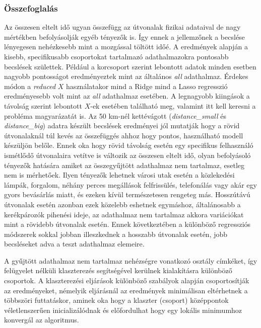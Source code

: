 \subsubsection{Összefoglalás}
Az összesen eltelt idő ugyan összefügg az útvonalak fizikai adataival de nagy mértékben befolyásolják egyéb tényezők is. Így ennek a jellemzőnek a becslése lényegesen nehézkesebb mint a mozgással töltött időé. A eredmények alapján a kisebb, specifikusabb csoportokat tartalmazó adathalmazokra pontosabb becslések születtek. Például a korcsoport szerint lebontott adatok minden esetben nagyobb pontosságot eredményeztek mint az általános \textit{all} adathalmaz. Érdekes módon a \textit{reduced} $X$ használatakor mind a Ridge mind a Lasso regresszió eredményesebb volt mint az \textit{all} adathalmaz esetében. A legnagyobb kiingások a távolság szerint lebontott $X$-ek esetében található meg, valamint itt kell keresni a probléma magyarázatát is. Az 50 km-nél kettévágott (\textit{distance\_small} és \textit{distance\_big}) adatra készült becslések eredményei jól mutatják hogy a rövid útvonalaknál túl kevés az összefüggés ahhoz hogy pontos, használható modell készüljön belőle. Ennek oka hogy rövid távolság esetén egy specifikus felhasználó ismétlődő útvonalaira vetítve is változik az összesen eltelt idő, olyan befolyásoló tényezők hatására amiket az összegyűjtött adathalmaz nem tartalmaz, esetleg nem is mérhetőek. Ilyen tényezők lehetnek városi utak esetén a közlekedési lámpák, forgalom, néhány perces megállások felfrissülés, telefonálás vagy akár egy gyors bevásárlás miatt, és ezeken kívül természetesen rengeteg más. Hosszútávú útvonalak esetén azonban ezek közelebb eshetnek egymáshoz, általánosabb a kerékpározók pihenési ideje, az adathalmaz nem tartalmaz akkora variációkat mint a rövidebb útvonalak esetén. Ennek következtében a különböző regressziós módszerek sokkal jobban illeszkednek a hosszabb útvonalak esetén, jobb becsléseket adva a teszt adathalmaz elemeire.





A gyűjtött adathalmaz nem tartalmaz nehézségre vonatkozó osztály címkéket, így felügyelet nélküli klaszterezés segítségével kerülnek kialakításra különböző csoportok. A klaszterezési eljárások különböző szabályok alapján csoportosítják az eredményeket, némelyik eljárásnál az eredmények minimálisan eltérhetnek a többszöri futtatáskor, aminek oka hogy a klaszter (csoport) középpontok véletlenszerűen inicializálódnak és előfordulhat hogy egy lokális minimumhoz konvergál az algoritmus.

